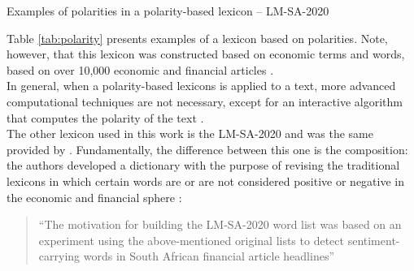 \begin{table}[!h]
\caption{Examples of polarities in a polarity-based lexicon -- LM-SA-2020}
\caption*{Source: Words and polarities taken from \cite[]{lmdata}}
\label{tab:polarity}
\end{table}

Table \ref{tab:polarity} presents examples of a lexicon based on polarities. Note, however, that this lexicon was constructed based on economic terms and words, based on over 10,000 economic and financial articles \cite[p.1]{lmdata}.\\

In general, when a polarity-based lexicons is applied to a text, more advanced computational techniques are not necessary, except for an interactive algorithm that computes the polarity of the text \cite[]{BCDG07}.\\ 

The other lexicon used in this work is the LM-SA-2020 and was the same provided by \cite{loughran2011liability}. Fundamentally, the difference between this one is the composition: the authors developed a dictionary with the purpose of revising the traditional lexicons in which certain words are or are not considered positive or negative in the economic and financial sphere \citep[p. 35]{loughran2011liability}:

\begin{quote}
    ``The motivation for building the LM-SA-2020 word list was based on an experiment using the above-mentioned original lists to detect sentiment-carrying words in South African financial article headlines''\citep[p. 1]{lmdata}
\end{quote}

